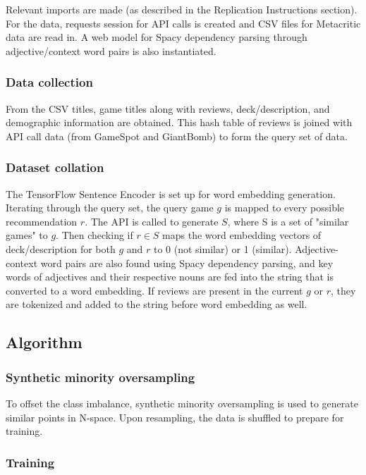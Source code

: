 \documentclass[10pt,twocolumn]{article}
\begin{document}
Relevant imports are made (as described in the Replication Instructions section). For the data, requests session for API calls is created and CSV files for Metacritic data are read in. A web model for Spacy dependency parsing through adjective/context word pairs is also instantiated.

\subsubsection{Data collection}

From the CSV titles, game titles along with reviews, deck/description, and demographic information are obtained. This hash table of reviews is joined with API call data (from GameSpot and GiantBomb) to form the query set of data.

\subsubsection{Dataset collation}
The TensorFlow Sentence Encoder is set up for word embedding generation. Iterating through the query set, the query game $g$ is mapped to every possible recommendation $r$. The API is called to generate $S$, where S is a set of "similar games" to $g$. Then checking if $r \in S$ maps the word embedding vectors of deck/description for both $g$ and $r$ to 0 (not similar) or 1 (similar). Adjective-context word pairs are also found using Spacy dependency parsing, and key words of adjectives and their respective nouns are fed into the string that is converted to a word embedding. If reviews are present in the current $g$ or $r$, they are tokenized and added to the string before word embedding as well.

\subsection{Algorithm}

\subsubsection{Synthetic minority oversampling}

To offset the class imbalance, synthetic minority oversampling \cite{NVChawla} is used to generate similar points in N-space. Upon resampling, the data is shuffled to prepare for training.

\subsubsection{Training}
\end{document}
